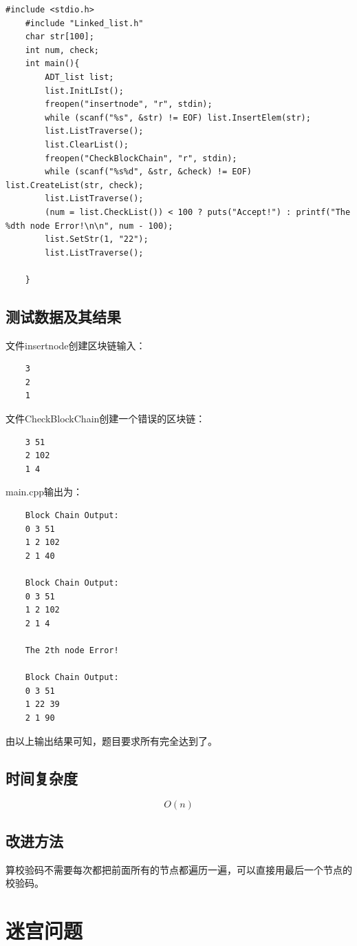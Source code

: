 \documentclass[a4paper,11pt,UTF8]{ctexart}
\begin{document}
\begin{lstlisting}[caption=main.cpp,captionpos=b]
    #include <stdio.h>
    #include "Linked_list.h"
    char str[100];
    int num, check;
    int main(){
        ADT_list list;
        list.InitLIst();
        freopen("insertnode", "r", stdin);
        while (scanf("%s", &str) != EOF) list.InsertElem(str);
        list.ListTraverse();
        list.ClearList();
        freopen("CheckBlockChain", "r", stdin);
        while (scanf("%s%d", &str, &check) != EOF) list.CreateList(str, check);
        list.ListTraverse();
        (num = list.CheckList()) < 100 ? puts("Accept!") : printf("The %dth node Error!\n\n", num - 100);
        list.SetStr(1, "22");
        list.ListTraverse();

    }
\end{lstlisting}
\subsection{测试数据及其结果}
文件insertnode创建区块链输入：
\begin{lstlisting}
    3
    2
    1
\end{lstlisting}

文件CheckBlockChain创建一个错误的区块链：
\begin{lstlisting}
    3 51
    2 102
    1 4
\end{lstlisting}

main.cpp输出为：
\begin{lstlisting}
    Block Chain Output:
    0 3 51
    1 2 102
    2 1 40

    Block Chain Output:
    0 3 51
    1 2 102
    2 1 4

    The 2th node Error!

    Block Chain Output:
    0 3 51
    1 22 39
    2 1 90
\end{lstlisting}

由以上输出结果可知，题目要求所有完全达到了。

\subsection{时间复杂度}
$$
O(n)
$$
\subsection{改进方法}
算校验码不需要每次都把前面所有的节点都遍历一遍，可以直接用最后一个节点的校验码。

\section{迷宫问题}
\end{document}
